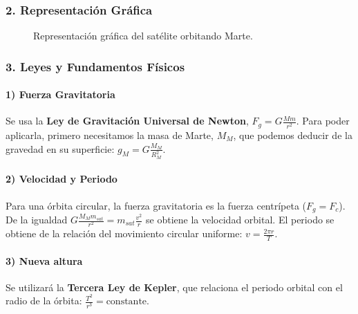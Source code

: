 \subsubsection*{2. Representación Gráfica}
\begin{figure}[H]
    \centering
    \caption{Representación gráfica del satélite orbitando Marte.}
\end{figure}

\subsubsection*{3. Leyes y Fundamentos Físicos}
\paragraph*{1) Fuerza Gravitatoria} Se usa la \textbf{Ley de Gravitación Universal de Newton}, $F_g = G \frac{M m}{r^2}$. Para poder aplicarla, primero necesitamos la masa de Marte, $M_M$, que podemos deducir de la gravedad en su superficie: $g_M = G \frac{M_M}{R_M^2}$.
\paragraph*{2) Velocidad y Periodo} Para una órbita circular, la fuerza gravitatoria es la fuerza centrípeta ($F_g = F_c$). De la igualdad $G \frac{M_M m_{sat}}{r^2} = m_{sat} \frac{v^2}{r}$ se obtiene la velocidad orbital. El periodo se obtiene de la relación del movimiento circular uniforme: $v = \frac{2\pi r}{T}$.
\paragraph*{3) Nueva altura} Se utilizará la \textbf{Tercera Ley de Kepler}, que relaciona el periodo orbital con el radio de la órbita: $\frac{T^2}{r^3} = \text{constante}$.

